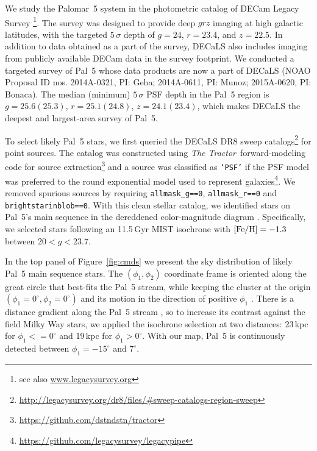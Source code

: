\documentclass[twocolumn]{aastex62}
\newcommand{\tractor}{\textsl{The Tractor}}
\newcommand{\sa}[1]{{\color{magenta} SP: #1}}
\begin{document}
We study the Palomar~5 system in the photometric catalog of DECam Legacy Survey \citep[DECaLS, part of the DESI Legacy Imaging Surveys,][]{dey2019}\footnote{see also \url{www.legacysurvey.org}}.
The survey was designed to provide deep $grz$ imaging at high galactic latitudes, with the targeted $5\,\sigma$ depth of $g=24$, $r=23.4$, and $z=22.5$.
In addition to data obtained as a part of the survey, DECaLS also includes imaging from publicly available DECam data in the survey footprint.
We conducted a targeted survey of Pal~5 whose data products are now a part of DECaLS (NOAO Proposal ID nos. 2014A-0321, PI: Geha; 2014A-0611, PI: Munoz; 2015A-0620, PI: Bonaca).
The median (minimum) $5\,\sigma$ PSF depth in the Pal~5 region is $g=25.6(25.3)$, $r=25.1(24.8)$, $z=24.1(23.4)$, which makes DECaLS the deepest and largest-area survey of Pal~5.

To select likely Pal~5 stars, we first queried the DECaLS DR8 sweep catalogs\footnote{\url{http://legacysurvey.org/dr8/files/\#sweep-catalogs-region-sweep}} for point sources.
The catalog was constructed using \tractor\ forward-modeling code for source extraction\footnote{\url{https://github.com/dstndstn/tractor}} and a source was classified as \texttt{`PSF'} if the PSF model was preferred to the round exponential model used to represent galaxies\footnote{\url{https://github.com/legacysurvey/legacypipe}}.
We removed spurious sources by requiring \texttt{allmask\_g==0}, \texttt{allmask\_r==0} and \texttt{brightstarinblob==0}.
With this clean stellar catalog, we identified stars on Pal~5's main sequence in the dereddened color-magnitude diagram \citep[using the re-calibrated SFD dust map;][]{Schlegel:1998, Schlafly:2011}.
Specifically, we selected stars following an 11.5\,Gyr MIST isochrone with $\rm [Fe/H] = -1.3$ \citep{Choi:2016} between $20<g<23.7$.

In the top panel of Figure~\ref{fig:cmds} we present the sky distribution of likely Pal~5 main sequence stars.
The $(\phi_1,\phi_2)$ coordinate frame is oriented along the great circle that best-fits the Pal~5 stream, while keeping the cluster at the origin $(\phi_1 = 0^\circ,\phi_2 = 0^\circ)$  and its motion in the direction of positive $\phi_1$ \citep{gala}.
There is a distance gradient along the Pal~5 stream \citep{Ibata:2016}, so to increase its contrast against the field Milky Way stars, we applied the isochrone selection at two distances: 23\,kpc for $\phi_1<=0^\circ$ and 19\,kpc for $\phi_1>0^\circ$.
With our map, Pal~5 is continuously detected between $\phi_1=-15^\circ$ and $7^\circ$.
\end{document}
